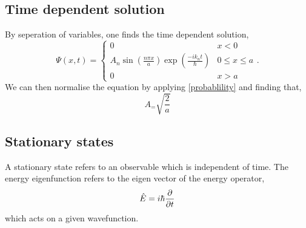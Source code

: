 \documentclass{book}
\begin{document}
\subsection{Time dependent solution}
By seperation of variables, one finds the time dependent solution,
\begin{equation}
	\Psi(x,t) = \begin{cases}
		0 & x < 0 \\
		A_n \sin\left(\frac{n\pi x}{a}\right)\exp\left(\frac{-ik_nt}{\hbar}\right) & 0 \leq x \leq a \\
		0 & x > a
	\end{cases}.
\end{equation}
We can then normalise the equation by applying \eqref{probablility} and finding that,
\begin{equation}
	A_ = \sqrt{\frac{2}{a}}
\end{equation}
\subsection{Stationary states}
A stationary state refers to an observable which is independent of time. The energy eigenfunction refers to the eigen vector of the energy operator,
\begin{equation}
	\hat{E} = i\hbar \pdv{}{t}
\end{equation}
which acts on a given wavefunction.
\end{document}
